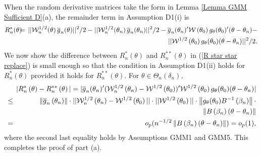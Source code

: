 \documentclass[12pt,titlepage,final,oneside,letterpaper]{article}
\begin{document}
When the random derivative matrices take the form in Lemma \ref{Lemma GMM
Sufficient D}(a), the remainder term in Assumption D1(i) is%
\begin{eqnarray}
R_{n}^{\ast }(\theta )\hspace{-0.08in} &=&\hspace{-0.08in}||\mathcal{W}%
_{n}^{1/2}\hspace{-0.02in}\left( \theta \right) \overline{g}_{n}(\theta
)||^{2}/2-||\mathcal{W}_{n}^{1/2}\hspace{-0.02in}\left( \theta _{n}\right) 
\overline{g}_{n}(\theta _{n})||^{2}/2-\overline{g}_{n}(\theta _{n})^{\prime }%
\mathcal{W}\left( \theta _{0}\right) g_{\theta }(\theta _{0})^{\prime
}(\theta -\theta _{n})-  \notag \\
&&\hspace{-0.08in}||\mathcal{W}^{1/2}\left( \theta _{0}\right) g_{\theta
}(\theta _{0})(\theta -\theta _{n})||^{2}/2.
\end{eqnarray}%
We now show the difference between $R_{n}^{\ast }\left( \theta \right) $ and 
$R_{n}^{\ast \ast }\left( \theta \right) $ in (\ref{R star star replace}) is
small enough so that the condition in Assumption D1(ii) holds for $%
R_{n}^{\ast }\left( \theta \right) $ provided it holds for $R_{n}^{\ast \ast
}\left( \theta \right) .$ For $\theta \in \Theta _{n}(\delta _{n}),$%
\begin{eqnarray}
&&\hspace{-0.08in}|R_{n}^{\ast }\left( \theta \right) -R_{n}^{\ast \ast
}\left( \theta \right) |\overset{}{=}|\overline{g}_{n}(\theta _{n})^{\prime
}(\mathcal{W}_{n}^{1/2}\left( \theta _{n}\right) -\mathcal{W}^{1/2}\left(
\theta _{0}\right) )^{\prime }\mathcal{W}^{1/2}\left( \theta _{0}\right)
g_{\theta }(\theta _{0})(\theta -\theta _{n})|  \notag \\
&\leq &\hspace{-0.08in}\left\Vert \overline{g}_{n}\left( \theta _{n}\right)
\right\Vert \cdot ||\mathcal{W}_{n}^{1/2}\left( \theta _{n}\right) -\mathcal{%
W}^{1/2}\left( \theta _{0}\right) ||\cdot ||\mathcal{W}^{1/2}\left( \theta
_{0}\right) ||\cdot \left\Vert g_{\theta }(\theta _{0})B^{-1}\left( \beta
_{n}\right) \right\Vert \cdot  \notag \\
&&\hspace{-0.08in}\left\Vert B\left( \beta _{n}\right) \left( \theta -\theta
_{n}\right) \right\Vert  \notag \\
&=&\hspace{-0.08in}o_{p}(n^{-1/2}\left\Vert B\left( \beta _{n}\right) \left(
\theta -\theta _{n}\right) \right\Vert )=o_{p}(1),
\end{eqnarray}%
where the second last equality holds by Assumptions GMM1 and GMM5. This
completes the proof of part (a).
\end{document}
